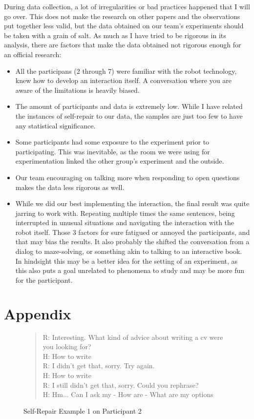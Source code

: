 \documentclass[11pt]{article}
\begin{document}
During data collection, a lot of irregularities or bad practices happened that I will go over. This does not make the research on other papers and the observations put together less valid, but the data obtained on our team's experiments should be taken with a grain of salt. As much as I have tried to be rigorous in its analysis, there are factors that make the data obtained not rigorous enough for an official research:
\begin{itemize}
	\item All the participans (2 through 7) were familiar with the robot technology, knew how to develop an interaction itself. A conversation where you are aware of the limitations is heavily biased.
	\item The amount of participants and data is extremely low. While I have related the instances of self-repair to our data, the samples are just too few to have any statistical significance. 
	\item Some participants had some exposure to the experiment prior to participating. This was inevitable, as the room we were using for experimentation linked the other group's experiment and the outside.
	\item Our team encouraging on talking more when responding to open questions makes the data less rigorous as well.	
	\item While we did our best implementing the interaction, the final result was quite jarring to work with. Repeating multiple times the same sentences, being interrupted in unusual situations and navigating the interaction with the robot itself. Those 3 factors for sure fatigued or annoyed the participants, and that may bias the results. It also probably the shifted the conversation from a dialog to maze-solving, or something akin to talking to an interactive book.
	In hindsight this may be a better idea for the setting of an experiment, as this also puts a goal unrelated to phenomena to study and may be more fun for the participant.
\end{itemize}




\appendix
\clearpage
\section{Appendix}
\label{sec:appendix}

\begin{figure}[!h]
\begin{quote}
R: Interesting. What kind of advice about writing a cv were you looking for?\\
H: How to write\\
R: I didn't get that, sorry. Try again.\\
H: How to write\\
R: I still didn't get that, sorry. Could you rephrase?\\
H: Hm... Can I ask my - How are - What are my options\\
\caption{Self-Repair Example 1 on Participant 2}
\label{selfrepair_12}
\end{quote}
\end{figure}
\end{document}
